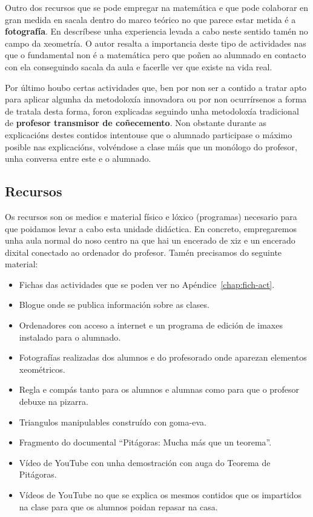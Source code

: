 Outro dos recursos que se pode empregar na matemática e que pode colaborar en gran medida en sacala dentro do marco teórico no que parece estar metida é a \textbf{fotografía}. En  descríbese unha experiencia levada a cabo neste sentido tamén no campo da xeometría. O autor resalta a importancia deste tipo de actividades nas que o fundamental non é a matemática pero que poñen ao alumnado en contacto con ela conseguindo sacala da aula e facerlle ver que existe na vida real.

Por último houbo certas actividades que, ben por non ser a contido a tratar apto para aplicar algunha da metodoloxía innovadora ou por non ocurrírsenos a forma de tratala desta forma, foron explicadas seguindo unha metodoloxía tradicional de \textbf{profesor transmisor de coñecemento}. Non obstante durante as explicacións destes contidos intentouse que o alumnado participase o máximo posible nas explicacións, volvéndose a clase máis que un monólogo do profesor, unha conversa entre este e o alumnado.

\subsection{Recursos}
Os recursos son os medios e material físico e lóxico (programas) necesario para que poidamos levar a cabo esta unidade didáctica. En concreto, empregaremos unha aula normal do noso centro na que hai un encerado de xiz e un encerado dixital conectado ao ordenador do profesor. Tamén precisamos do seguinte material:
\begin{itemize}
    \item Fichas das actividades que se poden ver no Apéndice~\ref{chap:fich-act}.
    \item Blogue onde se publica información sobre as clases.
    \item Ordenadores con acceso a internet e un programa de edición de imaxes instalado para o alumnado.
    \item Fotografías realizadas dos alumnos e do profesorado onde aparezan elementos xeométricos.
    \item Regla e compás tanto para os alumnos e alumnas como para que o profesor debuxe na pizarra.
    \item Triangulos manipulables construído con goma-eva.
    \item Fragmento do documental ``Pitágoras: Mucha más que un teorema''.
    \item Vídeo de YouTube con unha demostración con auga do Teorema de Pitágoras.
    \item Vídeos de YouTube no que se explica os mesmos contidos que os impartidos na clase para que os alumnos poidan repasar na casa.
\end{itemize}

